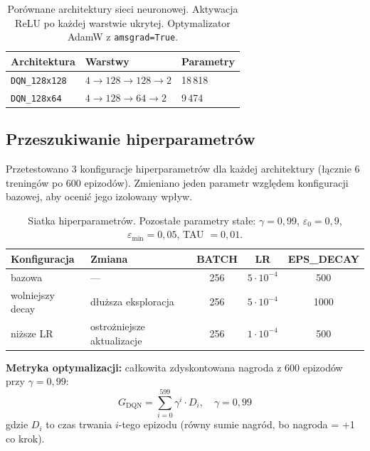 \documentclass[12pt,a4paper]{article}
\begin{document}
\begin{table}[h]
    \centering
    \begin{tabular}{lll}
        \toprule
        \textbf{Architektura} & \textbf{Warstwy} & \textbf{Parametry} \\
        \midrule
        \texttt{DQN\_128x128} & $4 \to 128 \to 128 \to 2$ & 18\,818 \\
        \texttt{DQN\_128x64}  & $4 \to 128 \to 64  \to 2$ & 9\,474  \\
        \bottomrule
    \end{tabular}
    \caption{Porównane architektury sieci neuronowej. Aktywacja ReLU po każdej
    warstwie ukrytej. Optymalizator AdamW z \texttt{amsgrad=True}.}
\end{table}

\subsection{Przeszukiwanie hiperparametrów}

Przetestowano 3 konfiguracje hiperparametrów dla każdej architektury
(łącznie 6 treningów po 600 epizodów). Zmieniano jeden parametr
względem konfiguracji bazowej, aby ocenić jego izolowany wpływ.

\begin{table}[h]
    \centering
    \begin{tabular}{llccc}
        \toprule
        \textbf{Konfiguracja} & \textbf{Zmiana} & \textbf{BATCH} & \textbf{LR} & \textbf{EPS\_DECAY} \\
        \midrule
        bazowa & — & 256 & $5 \cdot 10^{-4}$ & 500 \\
        wolniejszy decay & dłuższa eksploracja & 256 & $5 \cdot 10^{-4}$ & 1000 \\
        niższe LR & ostrożniejsze aktualizacje & 256 & $1 \cdot 10^{-4}$ & 500 \\
        \bottomrule
    \end{tabular}
    \caption{Siatka hiperparametrów. Pozostałe parametry stałe:
    $\gamma = 0{,}99$, $\varepsilon_0 = 0{,}9$, $\varepsilon_{\min} = 0{,}05$,
    TAU $= 0{,}01$.}
\end{table}

\textbf{Metryka optymalizacji:} całkowita zdyskontowana nagroda
z 600 epizodów przy $\gamma = 0{,}99$:
\begin{equation*}
    G_{\text{DQN}} = \sum_{i=0}^{599} \gamma^i \cdot D_i, \quad \gamma = 0{,}99
\end{equation*}
gdzie $D_i$ to czas trwania $i$-tego epizodu (równy sumie nagród, bo nagroda = +1 co krok).
\end{document}
